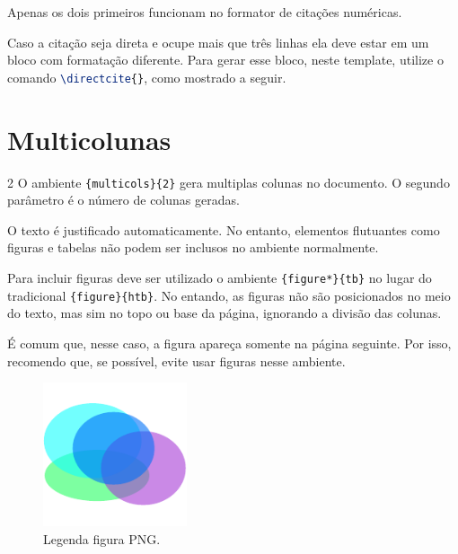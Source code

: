     Apenas os dois primeiros funcionam no formator de citações numéricas.

    Caso a citação seja direta e ocupe mais que três linhas ela deve estar em um bloco com formatação diferente.
    Para gerar esse bloco, neste template, utilize o comando \lstinline[language=TeX,style=code]|\directcite{}|, como mostrado a seguir.




\section{Multicolunas}
\label{sec:multicolunas}


    \begin{multicols}{2}
        O ambiente \lstinline[language=TeX,style=code]|{multicols}{2}| gera multiplas colunas no documento.
        O segundo parâmetro é o número de colunas geradas.

        O texto é justificado automaticamente.
        No entanto, elementos flutuantes como figuras e tabelas não podem ser inclusos no ambiente normalmente.

        Para incluir figuras deve ser utilizado o ambiente \lstinline[language=TeX,style=code]|{figure*}{tb}| no lugar do tradicional \lstinline[language=TeX,style=code]|{figure}{htb}|.
        No entando, as figuras não são posicionados no meio do texto, mas sim no topo ou base da página, ignorando a divisão das colunas.

        É comum que, nesse caso, a figura apareça somente na página seguinte.
        Por isso, recomendo que, se possível, evite usar figuras nesse ambiente.


        \begin{figure}[bt]
            \centering
            \includegraphics[width=120pt]{images/figure.pdf}
            \caption{Legenda figura PNG.}
            \label{fig:coluna_dupla}
        \end{figure}
        
        \lipsum[1][1-10]
    \end{multicols}

